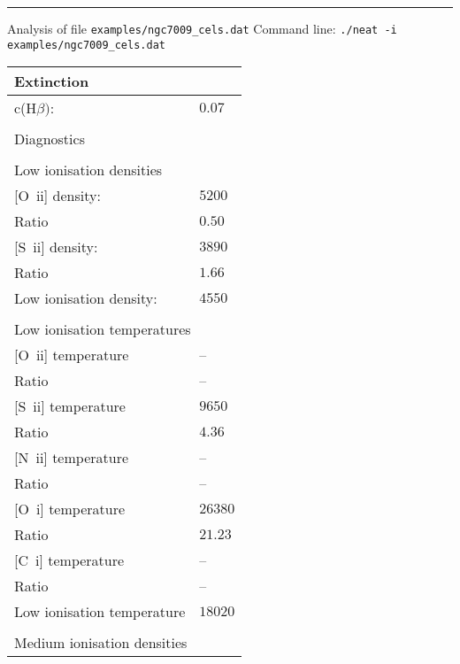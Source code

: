  \hrule
 \vspace{0.3cm}
 \noindent Analysis of file {\tt examples/ngc7009_cels.dat}\newline
 \noindent Command line: {\tt ./neat -i examples/ngc7009_cels.dat}\newline
 \begin{longtable}[l]{ll}
 \multicolumn{2}{l}{Extinction}\\ \hline
 c(H$\beta)$:                        & $  0.07$\\
 \vspace{0.2cm}\\\multicolumn{2}{l}{Diagnostics}\\ \hline
 \vspace{0.2cm}\\\multicolumn{2}{l}{Low ionisation densities}\\ \hline
 {}[O~{\sc ii}] density:             & $ 5200$\\
 Ratio                               & $  0.50$\\
 {}[S~{\sc ii}] density:             & $ 3890$\\
 Ratio                               & $  1.66$\\
 Low ionisation density:             & $ 4550$\\
 \vspace{0.2cm}\\\multicolumn{2}{l}{Low ionisation temperatures}\\ \hline
 {}[O~{\sc ii}] temperature          & -- \\
 Ratio                               & -- \\
 {}[S~{\sc ii}] temperature          & $ 9650$\\
 Ratio                               & $  4.36$\\
 {}[N~{\sc ii}] temperature          & -- \\
 Ratio                               & -- \\
 {}[O~{\sc i}] temperature           & $26380$\\
 Ratio                               & $ 21.23$\\
 {}[C~{\sc i}] temperature           & -- \\
 Ratio                               & -- \\
 Low ionisation temperature          & $18020$\\
 \vspace{0.2cm}\\\multicolumn{2}{l}{Medium ionisation densities}\\ \hline

\end{longtable}
